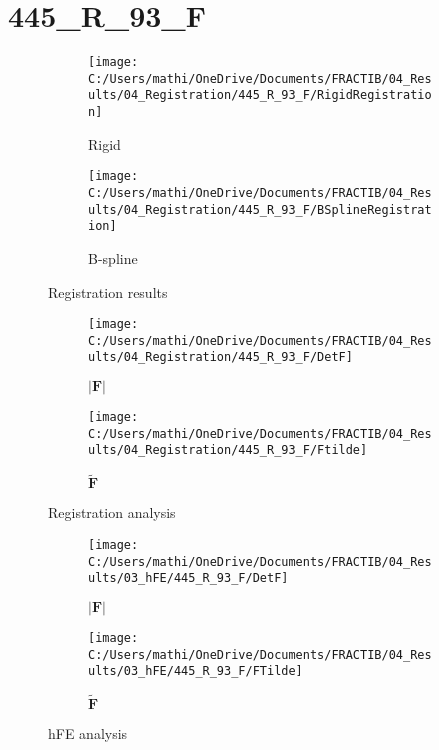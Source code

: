 \documentclass{article}%
\begin{document}
%
\newpage%
\section*{445\_R\_93\_F}%
\label{sec:445R93F}%


\begin{figure}[h!]%
\begin{subfigure}[b]{0.5\linewidth}%
\texttt{[image: C:/Users/mathi/OneDrive/Documents/FRACTIB/04\_Results/04\_Registration/445\_R\_93\_F/RigidRegistration]}%
\caption{Rigid}%
\end{subfigure}%
\begin{subfigure}[b]{0.5\linewidth}%
\texttt{[image: C:/Users/mathi/OneDrive/Documents/FRACTIB/04\_Results/04\_Registration/445\_R\_93\_F/BSplineRegistration]}%
\caption{B{-}spline}%
\end{subfigure}%
\caption{Registration results}%
\end{figure}

%


\begin{figure}[h!]%
\begin{subfigure}[b]{0.5\linewidth}%
\texttt{[image: C:/Users/mathi/OneDrive/Documents/FRACTIB/04\_Results/04\_Registration/445\_R\_93\_F/DetF]}%
\caption{$|\mathbf{F}|$}%
\end{subfigure}%
\begin{subfigure}[b]{0.5\linewidth}%
\texttt{[image: C:/Users/mathi/OneDrive/Documents/FRACTIB/04\_Results/04\_Registration/445\_R\_93\_F/Ftilde]}%
\caption{$\tilde{\mathbf{F}}$}%
\end{subfigure}%
\caption{Registration analysis}%
\end{figure}

%


\begin{figure}[h!]%
\begin{subfigure}[b]{0.5\linewidth}%
\texttt{[image: C:/Users/mathi/OneDrive/Documents/FRACTIB/04\_Results/03\_hFE/445\_R\_93\_F/DetF]}%
\caption{$|\mathbf{F}|$}%
\end{subfigure}%
\begin{subfigure}[b]{0.5\linewidth}%
\texttt{[image: C:/Users/mathi/OneDrive/Documents/FRACTIB/04\_Results/03\_hFE/445\_R\_93\_F/FTilde]}%
\caption{$\tilde{\mathbf{F}}$}%
\end{subfigure}%
\caption{hFE analysis}%
\end{figure}
\end{document}

